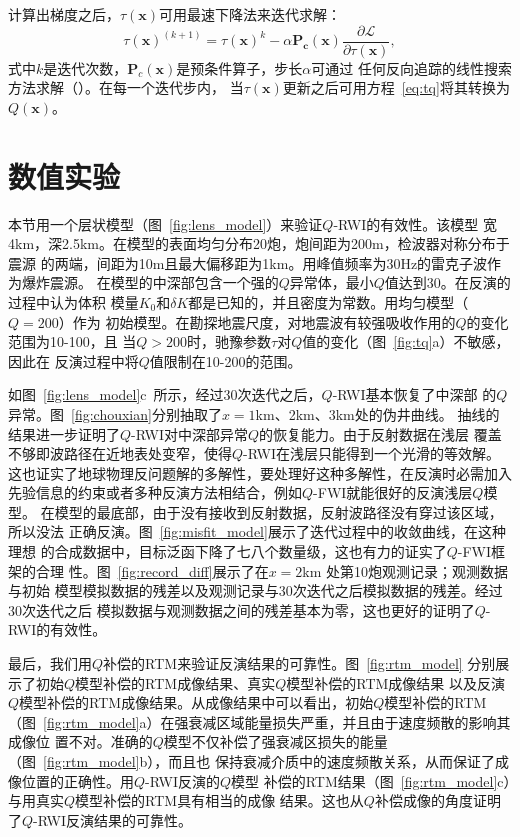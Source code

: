 计算出梯度之后，$\tau(\mathbf{x})$可用最速下降法来迭代求解：
\begin{equation}
    \tau(\mathbf{x})^{(k+1)}=\tau(\mathbf{x})^k-\alpha \mathbf{P_c}(\mathbf{x})
    \frac{\partial \mathcal{L}}{\partial \tau(\mathbf{x})},
\end{equation}
式中$k$是迭代次数，$\mathbf{P}_c(\mathbf{x})$是预条件算子，步长$\alpha$可通过
任何反向追踪的线性搜索方法求解（）。在每一个迭代步内，
当$\tau(\mathbf{x})$更新之后可用方程~\ref{eq:tq}将其转换为$Q(\mathbf{x})$。


\newpage
\section{数值实验}
本节用一个层状模型（图~\ref{fig:lens_model}）来验证$Q$-RWI的有效性。该模型
宽4km，深2.5km。在模型的表面均匀分布20炮，炮间距为200m，检波器对称分布于震源
的两端，间距为10m且最大偏移距为1km。用峰值频率为30Hz的雷克子波作为爆炸震源。
在模型的中深部包含一个强的$Q$异常体，最小$Q$值达到30。在反演的过程中认为体积
模量$K_0$和$\delta K$都是已知的，并且密度为常数。用均匀模型（$Q=200$）作为
初始模型。在勘探地震尺度，对地震波有较强吸收作用的$Q$的变化范围为10-100，且
当$Q>200$时，驰豫参数$\tau$对$Q$值的变化（图~\ref{fig:tq}a）不敏感，因此在
反演过程中将$Q$值限制在10-200的范围。

如图~\ref{fig:lens_model}c~所示，经过30次迭代之后，$Q$-RWI基本恢复了中深部
的$Q$异常。图~\ref{fig:chouxian}分别抽取了$x=1$km、2km、3km处的伪井曲线。
抽线的结果进一步证明了$Q$-RWI对中深部异常$Q$的恢复能力。由于反射数据在浅层
覆盖不够即波路径在近地表处变窄，使得$Q$-RWI在浅层只能得到一个光滑的等效解。
这也证实了地球物理反问题解的多解性，要处理好这种多解性，在反演时必需加入
先验信息的约束或者多种反演方法相结合，例如$Q$-FWI就能很好的反演浅层$Q$模型。
在模型的最底部，由于没有接收到反射数据，反射波路径没有穿过该区域，所以没法
正确反演。图~\ref{fig:misfit_model}展示了迭代过程中的收敛曲线，在这种理想
的合成数据中，目标泛函下降了七八个数量级，这也有力的证实了$Q$-FWI框架的合理
性。图~\ref{fig:record_diff}展示了在$x=2$km 处第10炮观测记录；观测数据与初始
模型模拟数据的残差以及观测记录与30次迭代之后模拟数据的残差。经过30次迭代之后
模拟数据与观测数据之间的残差基本为零，这也更好的证明了$Q$-RWI的有效性。

最后，我们用$Q$补偿的RTM来验证反演结果的可靠性。图~\ref{fig:rtm_model}
分别展示了初始$Q$模型补偿的RTM成像结果、真实$Q$模型补偿的RTM成像结果
以及反演$Q$模型补偿的RTM成像结果。从成像结果中可以看出，初始$Q$模型补偿的RTM
（图~\ref{fig:rtm_model}a）在强衰减区域能量损失严重，并且由于速度频散的影响其成像位
置不对。准确的$Q$模型不仅补偿了强衰减区损失的能量（图~\ref{fig:rtm_model}b），而且也
保持衰减介质中的速度频散关系，从而保证了成像位置的正确性。用$Q$-RWI反演的$Q$模型
补偿的RTM结果（图~\ref{fig:rtm_model}c）与用真实$Q$模型补偿的RTM具有相当的成像
结果。这也从$Q$补偿成像的角度证明了$Q$-RWI反演结果的可靠性。


